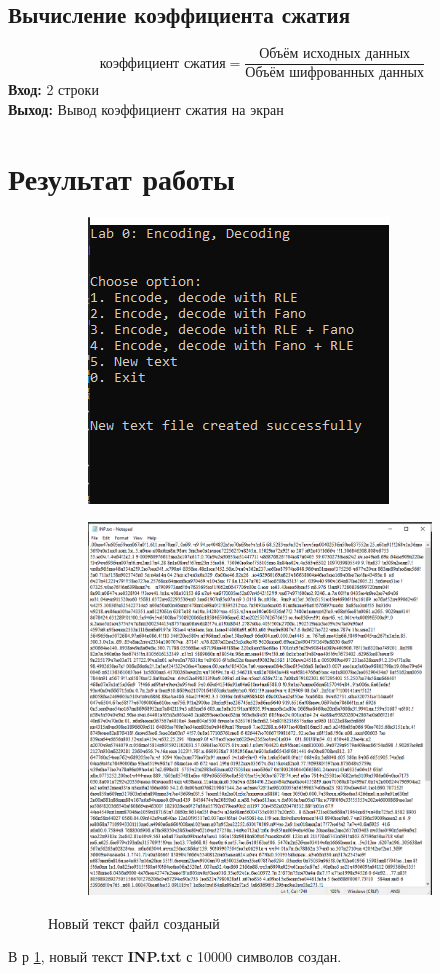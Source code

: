 \documentclass[12pt]{article} %
\begin{document}
\subsection{Вычисление коэффициента сжатия}
\[\text{ коэффициент сжатия} = \frac{\text{Объём исходных данных}}{\text{Объём шифрованных данных}}\]
\textbf{Вход: }2 строки \\
\textbf{Выход: }Вывод коэффициент сжатия на экран \\

\newpage
\section{Результат работы}
 \begin{figure}[H]
\centering
\begin{subfigure}
\centering
 \includegraphics[scale = 0.8]{textcreated.png}
\end{subfigure}
\hfill
\begin{subfigure}
\centering 
\includegraphics[scale = 0.3]{inp.png}
\end{subfigure}
\caption{Новый текст файл созданый} \label{text}
\end{figure}
В р \ref{text}, новый текст \textbf{INP.txt} с 10000 символов создан. 
\end{document}
